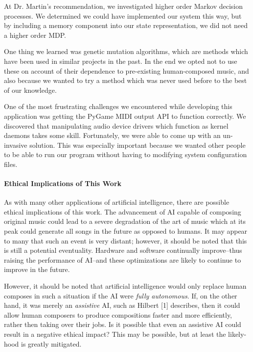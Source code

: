\documentclass{chi2009}
\begin{document}
At Dr. Martin's recommendation, we investigated higher order Markov decision processes. We determined we could have implemented our system this way, but by including a memory component into our state representation, we did not need a higher order MDP.

One thing we learned was genetic mutation algorithms, which are methods which have been used in similar projects in the past.  In the end we opted not to use these on account of their dependence to pre-existing human-composed music, and also because we wanted to try a method which was never used before to the best of our knowledge.

One of the most frustrating challenges we encountered while developing this application was getting the PyGame MIDI output API to function correctly.  We discovered that manipulating audio device drivers which function as kernel daemons takes some skill.  Fortunately, we were able to come up with an un-invasive solution.  This was especially important because we wanted other people to be able to run our program without having to modifying system configuration files.

\paragraph{\textbf{Ethical Implications of This Work}}

As with many other applications of artificial intelligence, there are possible ethical implications of this work.  The advancement of AI capable of composing original music could lead to a severe degradation of the art of music which at its peak could generate all songs in the future as opposed to humans.  It may appear to many that such an event is very distant; however, it should be noted that this is still a potential eventuality.  Hardware and software continually improve--thus raising the performance of AI--and these optimizations are likely to continue to improve in the future.

However, it should be noted that artificial intelligence would only replace human composes in such a situation if the AI were \textit{fully autonomous}.  If, on the other hand, it was merely an \textit{assistive} AI, such as Hilbert [1] describes, then it could allow human composers to produce compositions faster and more efficiently, rather then taking over their jobs.  Is it possible that even an assistive AI could result in a negative ethical impact?  This may be possible, but at least the likely-hood is greatly mitigated.
\end{document}
